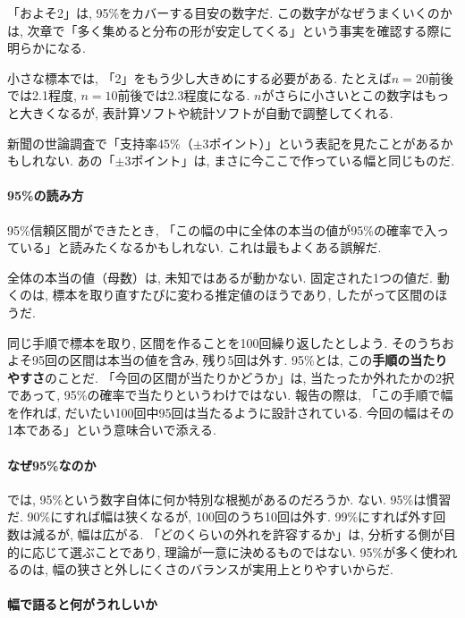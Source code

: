     「およそ2」は, 95\%をカバーする目安の数字だ.
    この数字がなぜうまくいくのかは, 次章で「多く集めると分布の形が安定してくる」という事実を確認する際に明らかになる.

    小さな標本では, 「2」をもう少し大きめにする必要がある.
    たとえば$n=20$前後では2.1程度, $n=10$前後では2.3程度になる.
    $n$がさらに小さいとこの数字はもっと大きくなるが,
    表計算ソフトや統計ソフトが自動で調整してくれる.

    新聞の世論調査で「支持率45\%（$\pm$3ポイント）」という表記を見たことがあるかもしれない.
    あの「$\pm$3ポイント」は, まさに今ここで作っている幅と同じものだ.

    \paragraph{95\%の読み方}

    95\%信頼区間ができたとき,
    「この幅の中に全体の本当の値が95\%の確率で入っている」と読みたくなるかもしれない.
    これは最もよくある誤解だ.

    全体の本当の値（母数）は, 未知ではあるが動かない.
    固定された1つの値だ.
    動くのは, 標本を取り直すたびに変わる推定値のほうであり, したがって区間のほうだ.

    同じ手順で標本を取り, 区間を作ることを100回繰り返したとしよう.
    そのうちおよそ95回の区間は本当の値を含み, 残り5回は外す.
    95\%とは, この\textbf{手順の当たりやすさ}のことだ.
    「今回の区間が当たりかどうか」は, 当たったか外れたかの2択であって,
    95\%の確率で当たりというわけではない.
    報告の際は,
    「この手順で幅を作れば, だいたい100回中95回は当たるように設計されている.
    今回の幅はその1本である」という意味合いで添える.

    \paragraph{なぜ95\%なのか}

    では, 95\%という数字自体に何か特別な根拠があるのだろうか.
    ない.
    95\%は慣習だ.
    90\%にすれば幅は狭くなるが, 100回のうち10回は外す.
    99\%にすれば外す回数は減るが, 幅は広がる.
    「どのくらいの外れを許容するか」は, 分析する側が目的に応じて選ぶことであり,
    理論が一意に決めるものではない.
    95\%が多く使われるのは, 幅の狭さと外しにくさのバランスが実用上とりやすいからだ.

    \paragraph{幅で語ると何がうれしいか}

